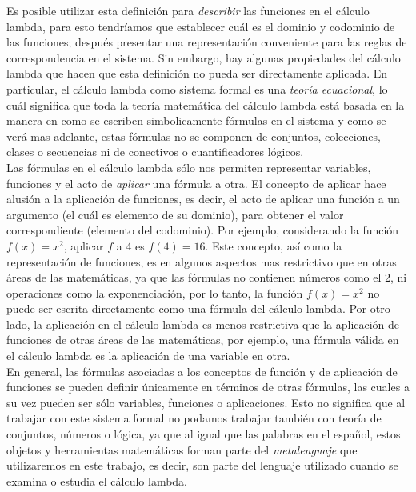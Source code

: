 Es posible utilizar esta definición para \emph{describir} las funciones en el
cálculo lambda, para esto tendríamos que establecer cuál es el dominio y
codominio de las funciones; después presentar una representación conveniente
para las reglas de correspondencia en el sistema. Sin embargo, hay algunas
propiedades del cálculo lambda que hacen que esta definición
no pueda ser directamente aplicada. En particular, el cálculo lambda como
sistema formal es una \emph{teoría ecuacional}, lo cuál significa que toda la
teoría matemática del cálculo lambda está basada en la manera en como se
escriben simbolicamente fórmulas en el sistema y como se verá mas adelante,
estas fórmulas no se componen de conjuntos, colecciones, clases o secuencias ni
de conectivos o cuantificadores lógicos.\\

Las fórmulas en el cálculo lambda sólo nos permiten representar variables,
funciones y el acto de \emph{aplicar} una fórmula a otra. El concepto de aplicar
hace alusión a la aplicación de funciones, es decir, el acto de aplicar una
función a un argumento (el cuál es elemento de su dominio), para obtener el
valor correspondiente (elemento del codominio). Por ejemplo, considerando la función
\(f(x)=x^2\), aplicar \(f\) a 4 es \(f(4)=16\). Este concepto, así como la
representación de funciones, es en algunos aspectos mas restrictivo que en otras
áreas de las matemáticas, ya que las fórmulas no contienen números como el 2, ni
operaciones como la exponenciación, por lo tanto, la función \(f(x)=x^2\) no
puede ser escrita directamente como una fórmula del cálculo lambda. Por otro
lado, la aplicación en el cálculo lambda es menos restrictiva que la aplicación
de funciones de otras áreas de las matemáticas, por ejemplo, una fórmula válida
en el cálculo lambda es la aplicación de una variable en otra.\\

En general, las fórmulas asociadas a los conceptos de función y de aplicación de
funciones se pueden definir únicamente en términos de otras fórmulas, las cuales
a su vez pueden ser sólo variables, funciones o aplicaciones. Esto no significa
que al trabajar con este sistema formal no podamos trabajar también con teoría
de conjuntos, números o lógica, ya que al igual que las palabras en el español,
estos objetos y herramientas matemáticas forman parte del \emph{metalenguaje}
que utilizaremos en este trabajo, es decir, son parte del lenguaje utilizado
cuando se examina o estudia el cálculo lambda.\\

